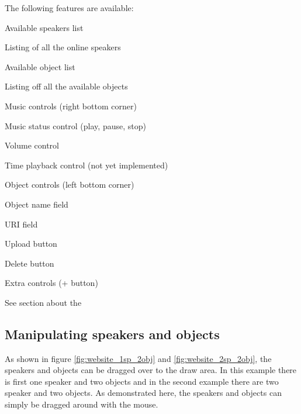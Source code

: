 The following features are available:
\begin{shortlist}
    \item Available speakers list
    \begin{shortlist}
        \item Listing of all the online speakers
    \end{shortlist}
    \item Available object list
    \begin{shortlist}
        \item Listing off all the available objects
    \end{shortlist}
    \item Music controls (right bottom corner)
    \begin{shortlist}
        \item Music status control (play, pause, stop)
        \item Volume control
        \item Time playback control (not yet implemented)
    \end{shortlist}
    \item Object controls (left bottom corner)
    \begin{shortlist}
        \item Object name field
        \item URI field
        \item Upload button
        \item Delete button
    \end{shortlist}
    \item Extra controls (+ button)
    \begin{shortlist}
        \item See section about the 
    \end{shortlist}
\end{shortlist}

\subsection{Manipulating speakers and objects}
\label{sub:manipulating_speakers_and_objects}
As shown in figure \ref{fig:website_1sp_2obj} and \ref{fig:website_2sp_2obj}, the speakers and objects can be dragged over to the draw area.
In this example there is first one speaker and two objects and in the second example there are two speaker and two objects.
As demonstrated here, the speakers and objects can simply be dragged around with the mouse.

